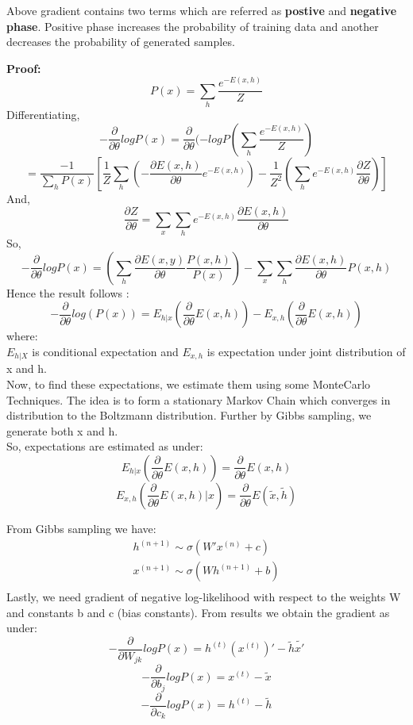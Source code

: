 Above gradient contains two terms which are referred as \textbf{postive} and \textbf{negative phase}. Positive phase increases the probability of training data and another decreases the probability of generated samples.

\textbf{Proof:}\\
    $$ P(x) = {\sum}_h{\frac{e^{-E(x,h)}}{Z}} $$
    Differentiating,
    $$ -{\frac{\partial}{\partial \theta}}logP(x) = {\frac{\partial}{\partial \theta}}(-logP({\sum}_h{\frac{e^{-E(x,h)}}{Z}}) $$
    $$  ={\frac{-1}{{\sum}_hP(x)}}[{\frac{1}{Z}}{\sum}_h(-{\frac{\partial E(x,h)}{\partial \theta}}e^{-E(x,h)})-{\frac{1}{Z^2}}({\sum}_he^{-E(x,h)}{\frac{\partial Z}{\partial \theta}})] $$
    And,
    $$ {\frac{\partial Z}{\partial \theta}} = {\sum}_x{\sum}_he^{-E(x,h)}{\frac{\partial E(x,h)}{\partial \theta}} $$
    So,
    $$ -{\frac{\partial}{\partial \theta}}logP(x) = ({\sum}_h{\frac{\partial E(x,y)}{\partial \theta}}{\frac{P(x,h)}{P(x)}})-{\sum}_x{\sum}_h{\frac{\partial E(x,h)}{\partial \theta}}P(x,h) $$ 
    Hence the result follows :
    $$ -\frac{\partial}{\partial \theta}log(P(x)) = E_{h|x} (\frac{\partial}{\partial \theta}E(x,h)) - E_{x,h}(\frac{\partial}{\partial \theta}E(x,h)) $$
    where:\\
    $E_{h|X}$ is conditional expectation and $E_{x,h}$ is expectation under joint distribution of x and h.\\
    Now, to find these expectations, we estimate them using some MonteCarlo Techniques. The idea is to form a stationary Markov Chain which converges in distribution to the Boltzmann distribution. Further by Gibbs sampling, we generate both x and h.\\
    So, expectations are estimated as under:\\
    $$ E_{h|x} (\frac{\partial}{\partial \theta}E(x,h)) ={\frac{\partial}{\partial \theta}}E(x,h) $$
    $$ E_{x,h}({\frac{\partial}{\partial \theta}}E(x,h)|x) ={\frac{\partial}{\partial \theta}}E(\tilde{x},\tilde{h}) $$


From Gibbs sampling we have:
\begin{equation*}
	\begin{multlined}
		h^{(n+1)} \sim \sigma(W'x^{(n)} + c)\\
		x^{(n+1)} \sim \sigma(Wh^{(n+1)} + b)\\
	\end{multlined}
\end{equation*}
Lastly, we need gradient of negative log-likelihood with respect to the weights W and constants b and c (bias constants). From results we obtain the gradient as under:\\
$$ -{\frac{\partial}{\partial W_{jk}}}logP(x) = h^{(t)}(x^{(t)})'-\tilde{h} \tilde{x'} $$ 
$$ -{\frac{\partial}{\partial b_j}}logP(x) = x^{(t)}-\tilde{x} $$ 
$$ -{\frac{\partial}{\partial c_k}}logP(x) = h^{(t)}-\tilde{h} $$
